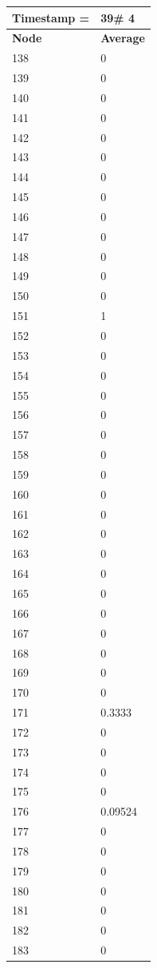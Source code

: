 \begin{tabular}{|l||l|}
\hline
\textbf{Timestamp =} & \textbf{39}\# 4\\\hline
	\textbf{Node} & \textbf{Average} \\ \hline
\hline
	138 & 0 \\ \hline
	139 & 0 \\ \hline
	140 & 0 \\ \hline
	141 & 0 \\ \hline
	142 & 0 \\ \hline
	143 & 0 \\ \hline
	144 & 0 \\ \hline
	145 & 0 \\ \hline
	146 & 0 \\ \hline
	147 & 0 \\ \hline
	148 & 0 \\ \hline
	149 & 0 \\ \hline
	150 & 0 \\ \hline
	151 & 1 \\ \hline
	152 & 0 \\ \hline
	153 & 0 \\ \hline
	154 & 0 \\ \hline
	155 & 0 \\ \hline
	156 & 0 \\ \hline
	157 & 0 \\ \hline
	158 & 0 \\ \hline
	159 & 0 \\ \hline
	160 & 0 \\ \hline
	161 & 0 \\ \hline
	162 & 0 \\ \hline
	163 & 0 \\ \hline
	164 & 0 \\ \hline
	165 & 0 \\ \hline
	166 & 0 \\ \hline
	167 & 0 \\ \hline
	168 & 0 \\ \hline
	169 & 0 \\ \hline
	170 & 0 \\ \hline
	171 & 0.3333 \\ \hline
	172 & 0 \\ \hline
	173 & 0 \\ \hline
	174 & 0 \\ \hline
	175 & 0 \\ \hline
	176 & 0.09524 \\ \hline
	177 & 0 \\ \hline
	178 & 0 \\ \hline
	179 & 0 \\ \hline
	180 & 0 \\ \hline
	181 & 0 \\ \hline
	182 & 0 \\ \hline
	183 & 0 \\ \hline
\end{tabular}
